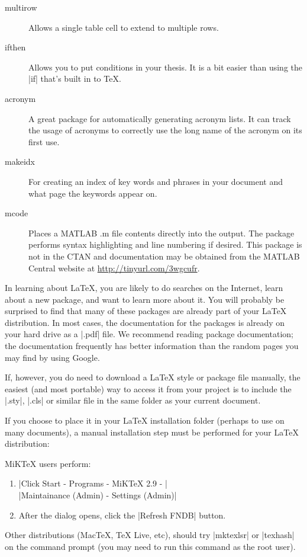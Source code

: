 \begin{description}
\item[multirow] Allows a single table cell to extend to multiple
rows.

\item[ifthen]  Allows you to put conditions in your thesis. It is a
bit easier than using the |if| that's built in to \TeX.

\item[acronym]  A great package for automatically generating acronym lists.
It can track the usage of acronyms to correctly use the long name of the acronym
on its first use.

\item[makeidx]  For creating an index of key words and phrases in your document and what page the keywords appear on.

\item[mcode]  Places a MATLAB .m file contents directly into the output.  The
package performs syntax highlighting and line numbering if desired.  This package is not in the CTAN
and documentation may be obtained from the MATLAB Central website at \url{http://tinyurl.com/3wgcufr}.

\end{description}

In learning about \LaTeX{}, you are likely to do searches on the Internet,
learn about a new package, and want to learn more about it. You will probably
be surprised to find that many of these packages are already part of your
\LaTeX{} distribution. In most cases, the documentation for the packages is
already on your hard drive as a |.pdf| file.  We recommend reading package
documentation; the documentation frequently has better information than the
random pages you may find by using Google.

If, however, you do need to download a \LaTeX{} style or package file manually,
the easiest (and most portable) way to access it from your project
is to include the |.sty|, |.cls| or similar 
file in the same folder as your current document. 

If you choose to place it in your
LaTeX installation folder (perhaps to use on many documents), a manual
installation step must be performed for your \LaTeX{} distribution:

MiKTeX users perform:
\begin{enumerate}
  \item |Click Start - Programs - MiKTeX 2.9 - | \\ 
    |Maintainance (Admin) - Settings (Admin)|
  \item After the dialog opens, click the |Refresh FNDB| button.
\end{enumerate}

Other distributions (MacTeX, TeX Live, etc), should try |mktexlsr| or |texhash|
on the command prompt (you may need to run this command as the root user).

